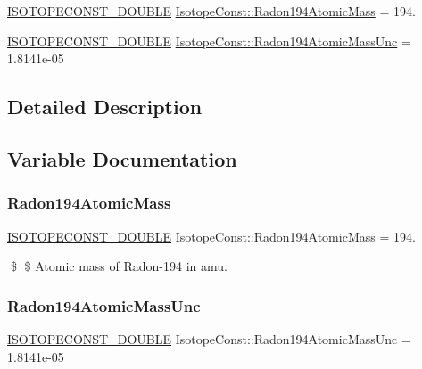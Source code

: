 \begin{DoxyCompactItemize}
\item 
\mbox{\hyperlink{group___isotope_const-_macros_ga8f45a7272ce02c0b4c65c44636ed719a}{I\+S\+O\+T\+O\+P\+E\+C\+O\+N\+S\+T\+\_\+\+D\+O\+U\+B\+LE}} \mbox{\hyperlink{group___isotope_const-_radon-_rn194_ga1e5a4718bcd843461178c6d51ebd7fd0}{Isotope\+Const\+::\+Radon194\+Atomic\+Mass}} = 194.
\item 
\mbox{\hyperlink{group___isotope_const-_macros_ga8f45a7272ce02c0b4c65c44636ed719a}{I\+S\+O\+T\+O\+P\+E\+C\+O\+N\+S\+T\+\_\+\+D\+O\+U\+B\+LE}} \mbox{\hyperlink{group___isotope_const-_radon-_rn194_ga064f7f3526f94be5a579baae280fb725}{Isotope\+Const\+::\+Radon194\+Atomic\+Mass\+Unc}} = 1.\+8141e-\/05
\end{DoxyCompactItemize}


\subsection{Detailed Description}


\subsection{Variable Documentation}
\mbox{\label{group___isotope_const-_radon-_rn194_ga1e5a4718bcd843461178c6d51ebd7fd0}} 
\subsubsection{\texorpdfstring{Radon194\+Atomic\+Mass}{Radon194AtomicMass}}
{\footnotesize\ttfamily \mbox{\hyperlink{group___isotope_const-_macros_ga8f45a7272ce02c0b4c65c44636ed719a}{I\+S\+O\+T\+O\+P\+E\+C\+O\+N\+S\+T\+\_\+\+D\+O\+U\+B\+LE}} Isotope\+Const\+::\+Radon194\+Atomic\+Mass = 194.}

\$ \$ Atomic mass of Radon-\/194 in amu. \mbox{\label{group___isotope_const-_radon-_rn194_ga064f7f3526f94be5a579baae280fb725}} 
\subsubsection{\texorpdfstring{Radon194\+Atomic\+Mass\+Unc}{Radon194AtomicMassUnc}}
{\footnotesize\ttfamily \mbox{\hyperlink{group___isotope_const-_macros_ga8f45a7272ce02c0b4c65c44636ed719a}{I\+S\+O\+T\+O\+P\+E\+C\+O\+N\+S\+T\+\_\+\+D\+O\+U\+B\+LE}} Isotope\+Const\+::\+Radon194\+Atomic\+Mass\+Unc = 1.\+8141e-\/05}

